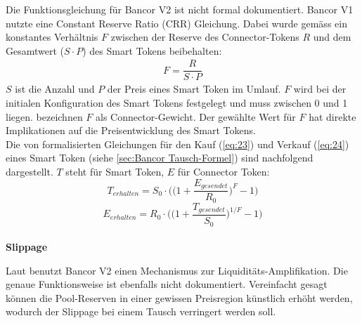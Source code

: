 \documentclass[12pt,a4paper,titlepage,oneside,english]{article}
\begin{document}
Die Funktionsgleichung für Bancor V2 ist nicht formal dokumentiert. Bancor V1 nutzte eine Constant Reserve Ratio (CRR) Gleichung. Dabei wurde gemäss \citet[S.1]{Rosenfeld2017} ein konstantes Verhältnis $F$ zwischen der Reserve des Connector-Tokens $R$ und dem Gesamtwert ($S \cdot P$) des Smart Tokens beibehalten: %
\begin{align}
F = \dfrac{R}{S \cdot P}  \label{eq:21} 
\end{align} %
$S$ ist die Anzahl und $P$ der Preis eines Smart Token im Umlauf. $F$ wird bei der initialen Konfiguration des Smart Tokens festgelegt und muss zwischen 0 und 1 liegen. \citet[S.9]{Hertzog2018} bezeichnen $F$ als Connector-Gewicht. Der gewählte Wert für $F$ hat direkte Implikationen auf die Preisentwicklung des Smart Tokens.\\
Die von \citet[S.2]{Rosenfeld2017} formalisierten Gleichungen für den Kauf (\ref{eq:23}) und Verkauf (\ref{eq:24}) eines Smart Token (siehe \ref{sec:Bancor Tausch-Formel}) sind nachfolgend dargestellt. $T$ steht für Smart Token, $E$ für Connector Token: 
\begin{equation}
T_{erhalten}  = S_{0} \cdot \Biggl(\biggl(1+\dfrac{E_{gesendet}}{R_{0}}\biggr)^{F} -1 \Biggr) \label{eq:23}
\end{equation}
\begin{equation}
E_{erhalten} = R_{0} \cdot \Biggl(\biggl(1+\dfrac{T_{gesendet}}{S_{0}}\biggr)^{1/F} -1\Biggr) \label{eq:24}
\end{equation}\\
\newpage
\textbf{Slippage}

Laut \citet{Shachav2020} benutzt Bancor V2 einen Mechanismus zur Liquiditäts-Amplifikation. Die genaue Funktionsweise ist ebenfalls nicht dokumentiert. Vereinfacht gesagt können die Pool-Reserven in einer gewissen Preisregion künstlich erhöht werden, wodurch der Slippage bei einem Tausch verringert werden soll. \\
\end{document}
